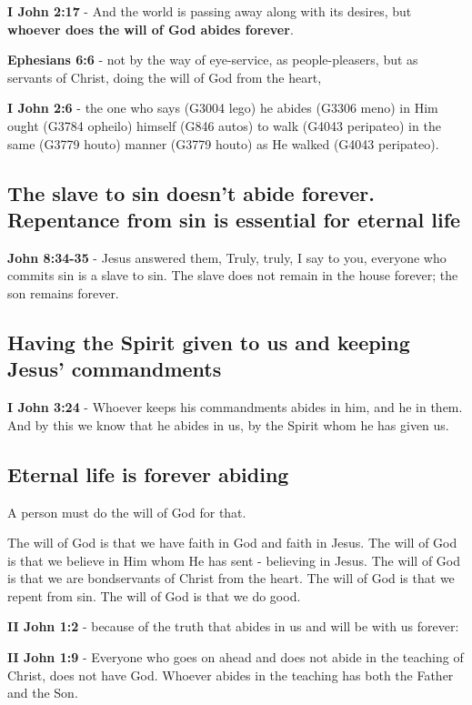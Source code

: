 \documentclass[11pt]{article}
\begin{document}
\textbf{I John 2:17} - And the world is passing away along with its desires, but \textbf{whoever does the will of God abides forever}.

\textbf{Ephesians 6:6} - not by the way of eye-service, as people-pleasers, but as servants of Christ, doing the will of God from the heart,

\textbf{I John 2:6} - the one who says (G3004 lego) he abides (G3306 meno) in Him ought (G3784 opheilo) himself (G846 autos) to walk (G4043 peripateo) in the same (G3779 houto) manner (G3779 houto) as He walked (G4043 peripateo).

\subsection{The slave to sin doesn't abide forever. Repentance from sin is essential for eternal life}
\label{sec:org3db429a}
\textbf{John 8:34-35} - Jesus answered them, Truly, truly, I say to you, everyone who commits sin is a slave to sin. The slave does not remain in the house forever; the son remains forever.

\subsection{Having the Spirit given to us and keeping Jesus' commandments}
\label{sec:org27e3ce3}
\textbf{I John 3:24} - Whoever keeps his commandments abides in him, and he in them. And by this we know that he abides in us, by the Spirit whom he has given us.

\subsection{Eternal life is forever abiding}
\label{sec:orgb0e50a1}
A person must do the will of God for that.

The will of God is that we have faith in God and faith in Jesus.
The will of God is that we believe in Him whom He has sent - believing in Jesus.
The will of God is that we are bondservants of Christ from the heart.
The will of God is that we repent from sin.
The will of God is that we do good.

\textbf{II John 1:2} - because of the truth that abides in us and will be with us forever:

\textbf{II John 1:9} - Everyone who goes on ahead and does not abide in the teaching of Christ, does not have God. Whoever abides in the teaching has both the Father and the Son.
\end{document}
